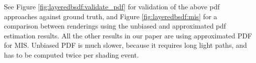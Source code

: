 

See Figure \ref{fig:layeredbsdf:validate_pdf} for validation of the above pdf approaches against ground truth, and Figure \ref{fig:layeredbsdf:mis} for a comparison between renderings using the unbiased and approximated pdf estimation results. 
All the other results in our paper are using approximated PDF for MIS. Unbiased PDF is much slower, because it requires long light paths, and has to be computed twice per shading event.





